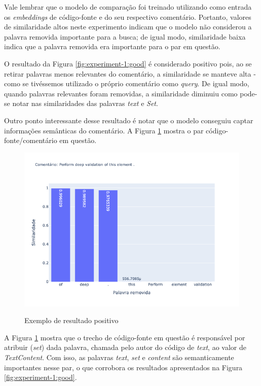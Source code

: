 Vale lembrar que o modelo de comparação foi treinado utilizando como entrada os \textit{embeddings} de código-fonte e do seu respectivo comentário. Portanto, valores de similaridade altos neste experimento indicam que o modelo não considerou a palavra removida importante para a busca; de igual modo, similaridade baixa indica que a palavra removida era importante para o par em questão.

O resultado da Figura \ref{fig:experiment-1:good} é considerado positivo pois, ao se retirar palavras menos relevantes do comentário, a similaridade se manteve alta - como se tivéssemos utilizado o próprio comentário como \textit{query}. De igual modo, quando palavras relevantes foram removidas, a similaridade diminuiu como pode-se notar nas similaridades das palavras \textit{text} e \textit{Set}.

Outro ponto interessante desse resultado é notar que o modelo conseguiu captar informações semânticas do comentário. A Figura \ref{fig:experiment-1-medium} mostra o par código-fonte/comentário em questão.

\begin{figure}[H]
  \centering
    \caption{Exemplo de resultado positivo}
    \includegraphics[scale=0.6]{imagens/resultados/experiment-1/sample_9.png}
  \label{fig:experiment-1-medium}
\end{figure}

A Figura \ref{fig:experiment-1-medium} mostra que o trecho de código-fonte em questão é responsável por atribuir (\textit{set}) dada palavra, chamada pelo autor do código de \textit{text}, ao valor de \textit{TextContent}. Com isso, as palavras \textit{text}, \textit{set} e \textit{content} são semanticamente importantes nesse par, o que corrobora os resultados apresentados na Figura \ref{fig:experiment-1:good}.

